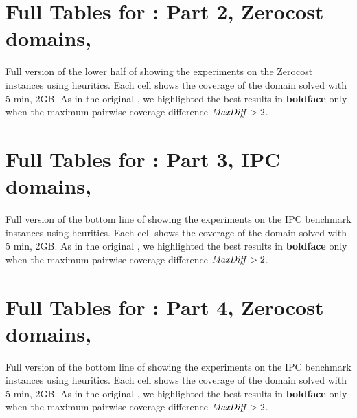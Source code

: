 \documentclass[10pt,letterpaper]{article}
\begin{document}
\newpage
\section{Full Tables for  : Part 2, Zerocost domains, \lmcut}

\begin{table}[htb]
 {
 \centering
 
 \caption{
 Full version of the lower half of  showing 
 the experiments on the Zerocost instances using \lmcut heuritics.
 Each cell shows the coverage of the domain solved with 5 min, 2GB.
 As in the original , we highlighted the best results in
 \textbf{boldface} only when the maximum pairwise coverage difference $\mit{MaxDiff}>2$.
 }
 \label{lmcut-zerocost-full}
 }
\end{table}

\newpage
\section{Full Tables for  : Part 3, IPC domains, \mands}

\begin{table}[htb]
 {
 \centering
 
 \caption{
 Full version of the bottom line of  showing 
 the experiments on the IPC benchmark instances using \mands heuritics.
 Each cell shows the coverage of the domain solved with 5 min, 2GB.
 As in the original , we highlighted the best results in
 \textbf{boldface} only when the maximum pairwise coverage difference $\mit{MaxDiff}>2$.
 }
 \label{mands-ipc-full}
 }
\end{table}

\newpage
\section{Full Tables for  : Part 4, Zerocost domains, \mands}

\begin{table}[htb]
 {
 \centering
 
 \caption{
 Full version of the bottom line of  showing 
 the experiments on the IPC benchmark instances using \mands heuritics.
 Each cell shows the coverage of the domain solved with 5 min, 2GB.
 As in the original , we highlighted the best results in
 \textbf{boldface} only when the maximum pairwise coverage difference $\mit{MaxDiff}>2$.
 }
 \label{mands-zerocost-full}
 }
\end{table}
\end{document}
